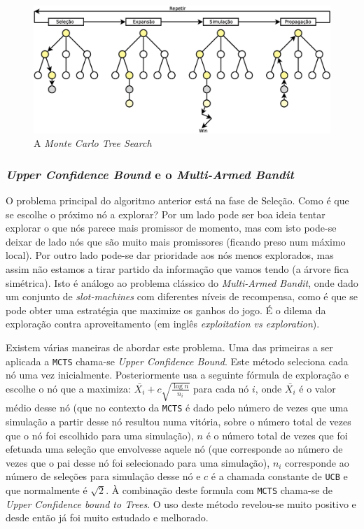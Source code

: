 \documentclass[12pt,a4paper,oneside]{article}
\begin{document}
\begin{figure}[!htb]
  \centering
  \includegraphics[width=1\textwidth]{mcts}
  \caption{A \textit{Monte Carlo Tree Search}}
  \label{fig:mcts}
\end{figure}

\subsubsection{\textit{Upper Confidence Bound} e o \textit{Multi-Armed Bandit}}

O problema principal do algoritmo anterior está na fase de
Seleção. Como é que se escolhe o próximo nó a explorar? Por um lado
pode ser boa ideia tentar explorar o que nós parece mais promissor de
momento, mas com isto pode-se deixar de lado nós que são muito mais
promissores (ficando preso num máximo local). Por outro lado pode-se
dar prioridade aos nós menos explorados, mas assim não estamos a tirar
partido da informação que vamos tendo (a árvore fica simétrica). Isto
é análogo ao problema clássico do \textit{Multi-Armed Bandit}, onde
dado um conjunto de \textit{slot-machines} com diferentes níveis de
recompensa, como é que se pode obter uma estratégia que maximize os
ganhos do jogo. É o dilema da exploração contra aproveitamento (em
inglês \textit{exploitation vs exploration}).

Existem várias maneiras de abordar este problema. Uma das primeiras a
ser aplicada a \texttt{MCTS} chama-se \textit{Upper Confidence
  Bound}. Este método seleciona cada nó uma vez
inicialmente. Posteriormente usa a seguinte fórmula de exploração e
escolhe o nó que a maximiza: $\bar{X_i} + c
\sqrt{\frac{\log{n}}{n_i}}$ para cada nó $i$, onde $\bar{X_i}$ é o
valor médio desse nó (que no contexto da \texttt{MCTS} é dado pelo
número de vezes que uma simulação a partir desse nó resultou numa
vitória, sobre o número total de vezes que o nó foi escolhido para uma
simulação), $n$ é o número total de vezes que foi efetuada uma seleção
que envolvesse aquele nó (que corresponde ao número de vezes que o pai
desse nó foi selecionado para uma simulação), $n_i$ corresponde ao
número de seleções para simulação desse nó e $c$ é a chamada constante
de \texttt{UCB} e que normalmente é $\sqrt{2}$. À combinação deste
formula com \texttt{MCTS} chama-se de \textit{Upper Confidence bound
  to Trees}. O uso deste método revelou-se muito positivo e desde
então já foi muito estudado e melhorado.
\end{document}
